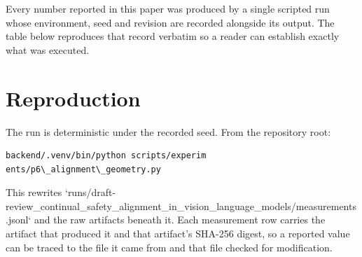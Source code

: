 \documentclass{article}
\begin{document}
Every number reported in this paper was produced by a single scripted run whose environment, seed and revision are recorded alongside its output. The table below reproduces that record verbatim so a reader can establish exactly what was executed.
\begin{table}[htbp]
\centering
{}
\end{table}


\section{Reproduction}


The run is deterministic under the recorded seed. From the repository root:


\begin{scriptsize}
\begin{verbatim}
backend/.venv/bin/python scripts/experim
ents/p6\_alignment\_geometry.py
\end{verbatim}
\end{scriptsize}


This rewrites `runs/draft-review\_continual\_safety\_alignment\_in\_vision\_language\_models/measurements.jsonl` and the raw artifacts beneath it. Each measurement row carries the artifact that produced it and that artifact's SHA-256 digest, so a reported value can be traced to the file it came from and that file checked for modification.
\end{document}
